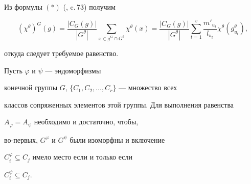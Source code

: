 \begin{pf} Из формулы $(*)$ (\cite{BelFomin}, c.\,73) получим


$$


(\chi^{\theta})^{G}(g)=\frac{|C_{G}(g)|}{|G^{\theta}|}


\sum\limits_{x\in g^{G}\cap G^{\theta}} \chi^{\theta}(x)=


\frac{|C_{G}(g)|}{|G^{\theta}|} \sum\limits^{v}_{t=1}


\frac{m'_{u_{t}}}{l_{u_{t}}} \chi^{\theta}(g^{\theta}_{u_{t}}),


$$


откуда следует требуемое равенство.


\end{pf}





\begin{thm}\label{equimg}


Пусть $\varphi$ и $\psi$ --- эндоморфизмы


конечной группы $G$, $\{C_{1},C_{2},\dotsc,C_{r}\}$ --- множество всех


классов сопряженных элементов этой группы. Для выполнения равенства


$A_{\varphi}=A_{\psi}$ необходимо и достаточно, чтобы,


во-первых, $G^{\varphi}$ и $G^{\psi}$ были изоморфны и включение


$C^{\varphi}_{i}\subseteq C_{j}$ имело место если и только если


$C^{\psi}_{i}\subseteq C_{j}$.


\end{thm}





